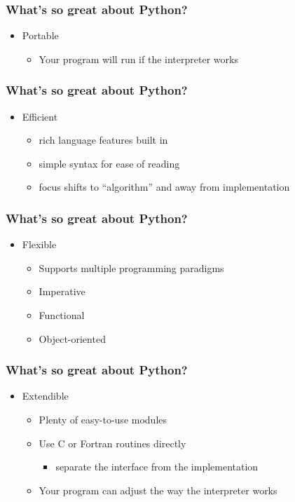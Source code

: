 \documentclass[xcolor=table,10pt,final]{beamer}
\begin{document}
\begin{frame}
  \frametitle{What's so great about Python?}
  \begin{itemize}
    \item Portable
      \begin{itemize}
        \item Your program will run if the interpreter works
      \end{itemize}
  \end{itemize}
\end{frame}
\begin{frame}
  \frametitle{What's so great about Python?}
  \begin{itemize}
    \item Efficient
      \begin{itemize}
        \item rich language features built in
        \item simple syntax for ease of reading
        \item focus shifts to ``algorithm'' and away from implementation
      \end{itemize}
  \end{itemize}
\end{frame}
\begin{frame}
  \frametitle{What's so great about Python?}
  \begin{itemize}
    \item Flexible
      \begin{itemize}
        \item Supports multiple programming paradigms
        \item Imperative
        \item Functional
        \item Object-oriented
      \end{itemize}
  \end{itemize}
\end{frame}
\begin{frame}
  \frametitle{What's so great about Python?}
  \begin{itemize}
    \item Extendible
      \begin{itemize}
        \item Plenty of easy-to-use modules
        \item Use C or Fortran routines directly
          \begin{itemize}
            \item separate the interface from the implementation
          \end{itemize}
        \item Your program can adjust the way the interpreter works
      \end{itemize}
  \end{itemize}
\end{frame}
\end{document}
